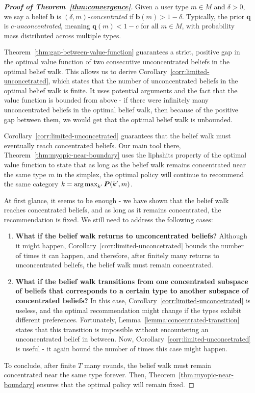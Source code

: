 \begin{proof}[\normalfont\bfseries Proof of Theorem~\ref{thm:convergence}]

Given a user type $m \in M$ and $\delta > 0$, we say a belief $\bm{b}$ is \emph{$(\delta,m)$-concentrated} if $\bm{b}(m) > 1-\delta$. Typically, the prior $\bm{q}$ is \emph{$c$-unconcentrated}, meaning $\bm{q}(m) < 1-c$ for all $m \in M$, with probability mass distributed across multiple types.

Theorem~\ref{thm:gap-between-value-function} guarantees a strict, positive gap in the optimal value function of two consecutive unconcentrated beliefs in the optimal belief walk. This allows us to derive Corollary~\ref{corr:limited-unconcetrated}, which states that the number of unconcentrated beliefs in the optimal belief walk is finite. It uses potential arguments and the fact that the value function is bounded from above - if there were infinitely many unconcentrated beliefs in the optimal belief walk, then because of the positive gap between them, we would get that the optimal belief walk is unbounded.

Corollary~\ref{corr:limited-unconcetrated} guarantees that the belief walk must eventually reach concentrated beliefs. Our main tool there, Theorem~\ref{thm:myopic-near-boundary} uses the liphshits property of the optimal value function to state that as long as the belief walk remains concentrated near the same type $m$ in the simplex, the optimal policy will continue to recommend the same category $k = \operatorname*{arg\,max}_{k'} \bm P(k',m)$.

At first glance, it seems to be enough - we have shown that the belief walk reaches concentrated beliefs, and as long as it remains concentrated, the recommendation is fixed. We still need to address the following cases:
\begin{enumerate}
    \item \textbf{What if the belief walk returns to unconcentrated beliefs?} Although it might happen, Corollary~\ref{corr:limited-unconcetrated} bounds the number of times it can happen, and therefore, after finitely many returns to unconcentrated beliefs, the belief walk must remain concentrated.
    \item \textbf{What if the belief walk transitions from one concentrated subspace of beliefs that corresponds to a certain type to another subspace of concentrated beliefs?} In this case, Corollary~\ref{corr:limited-unconcetrated} is useless, and the optimal recommendation might change if the types exhibit different preferences. Fortunately, Lemma~\ref{lemma:concentrated-transition} states that this transition is impossible without encountering an unconcentrated belief in between. Now, Corollary~\ref{corr:limited-unconcetrated} is useful - it again bound the number of times this case might happen.
\end{enumerate}

To conclude, after finite $T$ many rounds, the belief walk must remain concentrated near the same type forever. Then, Theorem~\ref{thm:myopic-near-boundary} ensures that the optimal policy will remain fixed.
\end{proof}

